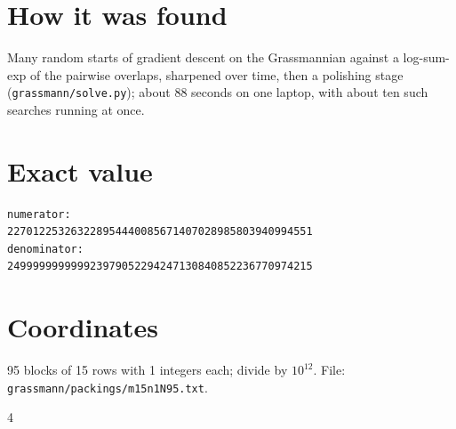 \documentclass[11pt,a4paper]{article}
\begin{document}
\section{How it was found}
Many random starts of gradient descent on the Grassmannian against a log-sum-exp of the pairwise overlaps, sharpened over time, then a polishing stage (\texttt{grassmann/solve.py}); about 88 seconds on one laptop, with about ten such searches running at once.


\appendix
\section{Exact value}
{\small
\begin{verbatim}
numerator:
227012253263228954440085671407028985803940994551
denominator:
249999999999923979052294247130840852236770974215
\end{verbatim}}

\section{Coordinates}
95 blocks of 15 rows with 1 integers each; divide by $10^{12}$. File: \texttt{grassmann/packings/m15n1N95.txt}.
{\tiny
\begin{multicols}{4}
\end{multicols}}
\end{document}
